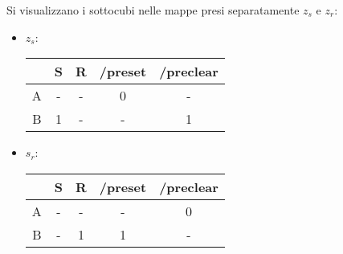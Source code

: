 \documentclass[a4paper,11pt]{article}
\begin{document}
Si visualizzano i sottocubi nelle mappe presi separatamente $z_s$ e $z_r$:
\begin{itemize}
	\item $z_s$:
\begin{center}
\noindent
\begin{minipage}{0.3\textwidth}
	\begin{karnaugh-map}[4][4][1][/preclear][/preset][R][S]
	\end{karnaugh-map}
\end{minipage}%
\hspace{3cm}
\begin{minipage}{0.3\textwidth}
	\begin{table}[H]
		\center {}
		\begin{tabular} { c || c | c | c | c}
			& S & R & /preset & /preclear \\ 
			\hline 
			\rowcolor{red!20!white} A & - & - & 0 & - \\
			\rowcolor{green!20!white} B & 1 & - & - & 1 \\
		\end{tabular}
	\end{table}
\end{minipage}
\end{center}
\item $s_r$:
\begin{center}
\noindent
\begin{minipage}{0.3\textwidth}
	\begin{karnaugh-map}[4][4][1][/preclear][/preset][R][S]
	\end{karnaugh-map}
\end{minipage}%
\hspace{3cm}
\begin{minipage}{0.3\textwidth}
	\begin{table}[H]
		\center {}
		\begin{tabular} { c || c | c | c | c}
			& S & R & /preset & /preclear \\ 
			\hline 
			\rowcolor{red!20!white} A & - & - & - & 0 \\
			\rowcolor{green!20!white} B & - & 1 & 1 & - \\
		\end{tabular}
	\end{table}
\end{minipage}
\end{center}
\end{itemize}
\end{document}
